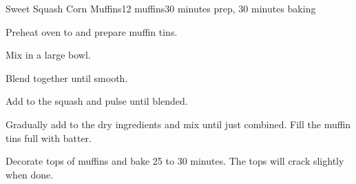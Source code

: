 \documentclass[../Cookbook.tex]{subfiles}
\begin{document}
\begin{recipe}{Sweet Squash Corn Muffins}{12 muffins}{30 minutes prep, 30 minutes baking}

Preheat oven to  and prepare muffin tins.

Mix in a large bowl.

Blend together until smooth.

Add to the squash and pulse until blended.

Gradually add to the dry ingredients and mix until just combined. Fill the muffin tins full with batter.

Decorate tops of muffins and bake 25 to 30 minutes. The tops will crack slightly when done.

\end{recipe}
\end{document}
